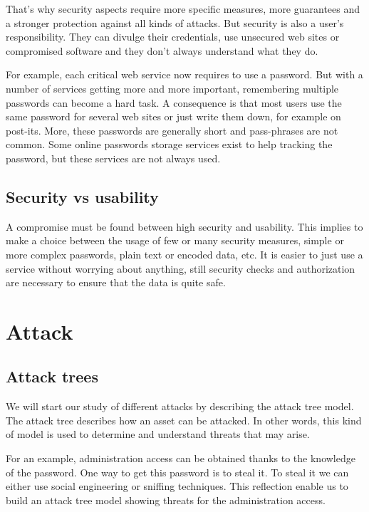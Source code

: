 That's why security aspects require more specific measures, more guarantees and
a stronger protection against all kinds of attacks. But security is also a user's
responsibility. They can divulge their credentials, use unsecured web sites or
compromised software and they don't always understand what they do.

For example, each critical web service now requires to use a password.
But with a number of services getting more and more important, remembering
multiple passwords can become a hard task. A consequence is that most users use
the same password for several web sites or just write them down, for example
on post-its. More, these passwords are generally short and pass-phrases are
not common.
Some online passwords storage services exist to help tracking the password, but
these services are not always used.

\subsection{Security vs usability}

A compromise must be found between high security and usability.
This implies to make a choice between the usage of few or many security
measures, simple or more complex passwords, plain text or encoded data, etc.
It is easier to just use a service without worrying about anything, still
security checks and authorization are necessary to ensure that the data is
quite safe.

\section{Attack}

\subsection{Attack trees}

We will start our study of different attacks by describing the attack tree model.
The attack tree describes how an asset can be attacked. In other words, this
kind of model is used to determine and understand threats that may arise.

\begin{figure}[htb]
\end{figure}

For an example, administration access can be obtained
thanks to the knowledge of the password. One way to get this password is to
steal it. To steal it we can either use social engineering or sniffing
techniques.
This reflection enable us to build an attack tree model showing threats
for the administration access.

